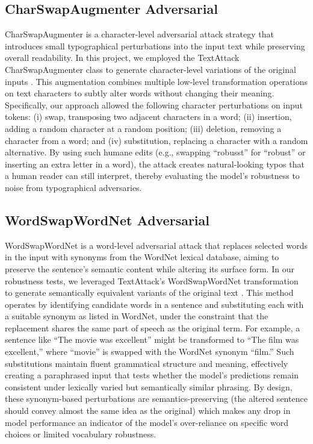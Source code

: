 \documentclass[conference]{IEEEtran}
\begin{document}
\subsection{CharSwapAugmenter Adversarial}

CharSwapAugmenter is a character-level adversarial attack strategy that introduces small typographical perturbations into the input text while preserving overall readability. In this project, we employed the TextAttack CharSwapAugmenter class to generate character-level variations of the original inputs \cite{textattack2020framework}. This augmentation combines multiple low-level transformation operations on text characters to subtly alter words without changing their meaning. Specifically, our approach allowed the following character perturbations on input tokens: (i) swap, transposing two adjacent characters in a word; (ii) insertion, adding a random character at a random position; (iii) deletion, removing a character from a word; and (iv) substitution, replacing a character with a random alternative. By using such humane edits (e.g., swapping “robusst” for “robust” or inserting an extra letter in a word), the attack creates natural-looking typos that a human reader can still interpret, thereby evaluating the model’s robustness to noise from typographical adversaries.

\subsection{WordSwapWordNet Adversarial}

WordSwapWordNet is a word-level adversarial attack that replaces selected words in the input with synonyms from the WordNet lexical database, aiming to preserve the sentence’s semantic content while altering its surface form. In our robustness tests, we leveraged TextAttack’s WordSwapWordNet transformation to generate semantically equivalent variants of the original text \cite{textattack2020framework}. This method operates by identifying candidate words in a sentence and substituting each with a suitable synonym as listed in WordNet, under the constraint that the replacement shares the same part of speech as the original term. For example, a sentence like “The movie was excellent” might be transformed to “The film was excellent,” where “movie” is swapped with the WordNet synonym “film.” Such substitutions maintain fluent grammatical structure and meaning, effectively creating a paraphrased input that tests whether the model’s predictions remain consistent under lexically varied but semantically similar phrasing. By design, these synonym-based perturbations are semantics-preserving (the altered sentence should convey almost the same idea as the original) which makes any drop in model performance an indicator of the model’s over-reliance on specific word choices or limited vocabulary robustness.
\end{document}
